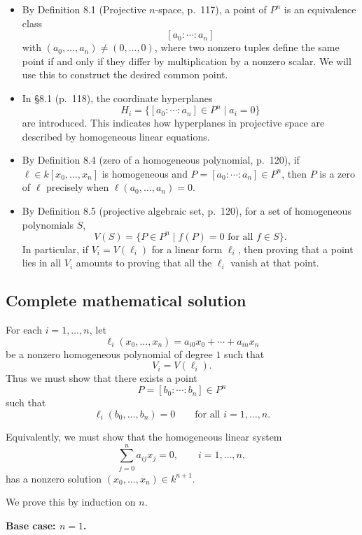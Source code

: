 \documentclass[a4paper,12pt,openany]{article}
\theoremstyle{plain}
\theoremstyle{definition}
\theoremstyle{remark}
\begin{document}
\begin{itemize}
    \item By Definition 8.1 (Projective $n$-space, p.~117), a point of $P^n$
    is an equivalence class
    \[
    [a_0:\cdots:a_n]
    \]
    with $(a_0,\dots,a_n)\neq (0,\dots,0)$, where two nonzero tuples define
    the same point if and only if they differ by multiplication by a nonzero
    scalar. We will use this to construct the desired common point.

    \item In \S8.1 (p.~118), the coordinate hyperplanes
    \[
    H_i=\{[a_0:\cdots:a_n]\in P^n\mid a_i=0\}
    \]
    are introduced. This indicates how hyperplanes in projective space are
    described by homogeneous linear equations.

    \item By Definition 8.4 (zero of a homogeneous polynomial, p.~120), if
    $\ell\in k[x_0,\dots,x_n]$ is homogeneous and
    $P=[a_0:\cdots:a_n]\in P^n$, then $P$ is a zero of $\ell$ precisely when
    $\ell(a_0,\dots,a_n)=0$.

    \item By Definition 8.5 (projective algebraic set, p.~120), for a set of
    homogeneous polynomials $S$,
    \[
    V(S)=\{P\in P^n\mid f(P)=0 \text{ for all } f\in S\}.
    \]
    In particular, if $V_i=V(\ell_i)$ for a linear form $\ell_i$, then proving
    that a point lies in all $V_i$ amounts to proving that all the $\ell_i$
    vanish at that point.
\end{itemize}

\subsection*{Complete mathematical solution}

For each $i=1,\dots,n$, let
\[
\ell_i(x_0,\dots,x_n)=a_{i0}x_0+\cdots+a_{in}x_n
\]
be a nonzero homogeneous polynomial of degree $1$ such that
\[
V_i=V(\ell_i).
\]
Thus we must show that there exists a point
\[
P=[b_0:\cdots:b_n]\in P^n
\]
such that
\[
\ell_i(b_0,\dots,b_n)=0
\qquad\text{for all } i=1,\dots,n.
\]

Equivalently, we must show that the homogeneous linear system
\[
\sum_{j=0}^n a_{ij}x_j=0,
\qquad i=1,\dots,n,
\]
has a nonzero solution $(x_0,\dots,x_n)\in k^{n+1}$.

We prove this by induction on $n$.

\medskip

\noindent\textbf{Base case: $n=1$.}
\end{document}
